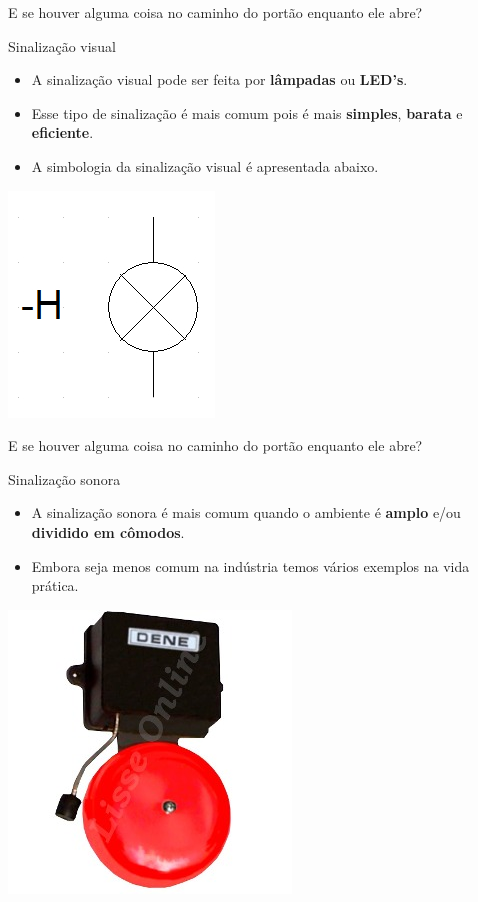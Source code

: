 \begin{frame}{E se houver alguma coisa no caminho do portão enquanto ele abre?}
\begin{block}{Sinalização visual}
\begin{itemize}
    \item A sinalização visual pode ser feita por \textbf{lâmpadas} ou \textbf{LED's}.
    \item Esse tipo de sinalização é mais comum pois é mais \textbf{simples}, \textbf{barata} e \textbf{eficiente}.
    \item A simbologia da sinalização visual é apresentada abaixo.
\end{itemize}
\end{block}
\centerline{\includegraphics[width=0.3\linewidth]{Figuras/Ch05/fig18.jpg}}
\end{frame}


\begin{frame}{E se houver alguma coisa no caminho do portão enquanto ele abre?}
\begin{block}{Sinalização sonora}
\begin{itemize}
    \item A sinalização sonora é mais comum quando o ambiente é \textbf{amplo} e/ou \textbf{dividido em cômodos}.
    \item Embora seja menos comum na indústria temos vários exemplos na vida prática.
\end{itemize}
\end{block}
\centerline{\includegraphics[width=0.4\linewidth]{Figuras/Ch05/fig19.jpg}}
\end{frame}


